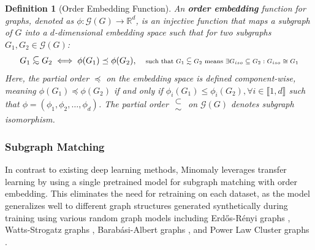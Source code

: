 \documentclass[pdflatex,sn-mathphys-num]{sn-jnl}%
\newcommand\subsetsim{\mathrel{\substack{
  \textstyle\subset\\[-0.2ex]\textstyle\sim}}}
\theoremstyle{thmstyleone}%
\theoremstyle{thmstyletwo}%
\theoremstyle{thmstylethree}%
\newtheorem{definition}{Definition}%
\begin{document}
\begin{definition}[Order Embedding Function]
An \textbf{order embedding} function for graphs, denoted as $\phi:\mathcal{G}(G) \to \mathbb{R}^d$, is an injective function that maps a subgraph of $G$ into a $d$-dimensional embedding space such that for two subgraphs $G_1, G_2 \in \mathcal{G}(G)$:
\[
G_1 \subsetsim G_2 \iff \phi(G_1) \preceq \phi(G_2), \quad
\text{\scriptsize such that $G_1 \subsetsim G_2$  means $\exists G_{iso} \subseteq G_2 : G_{iso} \cong G_1$}
\]
Here, the partial order $\preceq$ on the embedding space is defined component-wise, meaning $\phi(G_1) \preceq \phi(G_2)$ if and only if $\phi_i(G_1) \leq \phi_i(G_2), \forall i \in \llbracket 1, d \rrbracket$ such that $\phi = (\phi_1, \phi_2, \dots, \phi_d)$. The partial order $\subsetsim$ on $\mathcal{G}(G)$ denotes subgraph isomorphism.
\end{definition}

\subsubsection{Subgraph Matching}
In contrast to existing deep learning methods, Minomaly leverages transfer learning by using a single pretrained model for subgraph matching with order embedding. This eliminates the need for retraining on each dataset, as the model generalizes well to different graph structures generated synthetically during training using various random graph models including Erdős-Rényi graphs \cite{erd6s1959random}, Watts-Strogatz graphs \cite{watts1998collective}, Barabási-Albert graphs \cite{barabasi1999emergence}, and Power Law Cluster graphs \cite{holme2002growing}.
\end{document}
